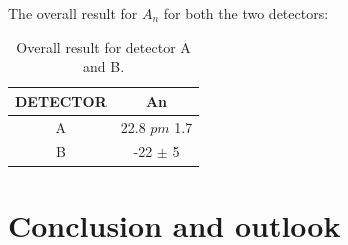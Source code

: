 The overall result for $A_{n}$ for both the two detectors:

\begin{table}
\centering
\begin{tabular}{c|c}
\hline
 DETECTOR   & An    \\
\hline
 A          & 22.8 $pm$ 1.7  \\
 B          & -22 $\pm$ 5   \\
\hline
\end{tabular}
\caption{Overall result for detector A and B.}
\end{table}

\chapter{Conclusion and outlook} \label{conclusion}

